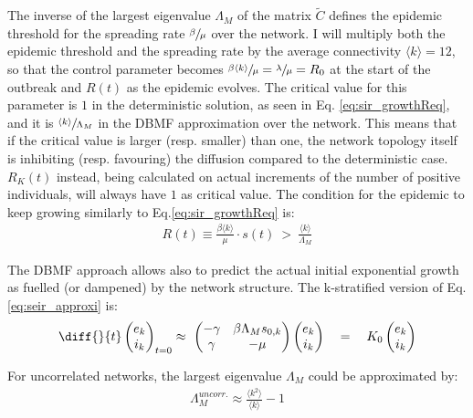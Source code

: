 \documentclass[DIV=12, BCOR=0pt]{scrartcl}  %
\begin{document}
  The inverse of the largest eigenvalue $\Lambda_M$ of the matrix $\tilde{C}$ defines the epidemic threshold for the spreading rate $\sfrac{\beta}{\mu}$ over the network. I will multiply both the epidemic threshold and the spreading rate by the average connectivity $\langle k \rangle = 12$, so that the control parameter becomes $\sfrac{\beta \langle k \rangle}{\mu} = \sfrac{\lambda}{\mu} = R_0$ at the start of the outbreak and $R(t)$ as the epidemic evolves. The critical value for this parameter is $1$ in the deterministic solution, as seen in Eq. \ref{eq:sir_growthReq}, and it is $\sfrac{\langle k \rangle}{\Lambda_M}$ in the DBMF approximation over the network. This means that if the critical value is larger (resp. smaller) than one, the network topology itself is inhibiting (resp. favouring) the diffusion compared to the deterministic case. $R_K(t)$ instead, being calculated on actual increments of the number of positive individuals, will always have $1$ as critical value. The condition for the epidemic to keep growing similarly to Eq.\ref{eq:sir_growthReq} is:
  \begin{align}
		 R(t) \equiv \frac{\beta \langle k \rangle }{\mu} \cdot s(t) \ > \ \frac{\langle k \rangle}{\Lambda_M}
  \end{align}
  
  The DBMF approach allows also to predict the actual initial exponential growth as fuelled (or dampened) by the network structure. The k-stratified version of Eq. \ref{eq:seir_approxi} is:
  \begin{align}
    	\diff{}{t}
	  \begin{pmatrix}
	  	e_k \\
	  	i_k
	  \end{pmatrix}_{t=0}
	  \approx \
	  \begin{pmatrix}
	  	- \gamma & \beta \Lambda_M s_{0,k} \\
	  	\gamma & - \mu
	  \end{pmatrix}
	  \begin{pmatrix}
	  	e_k \\
	  	i_k
	  \end{pmatrix}
	  \quad = \quad K_0 %
	  \begin{pmatrix}
	  	e_k \\
	  	i_k
	  \end{pmatrix} %
	  \label{eq:seir_approxiDBMF}
  \end{align}
  
  For uncorrelated networks, the largest eigenvalue $\Lambda_M$ could be approximated by:
  \begin{align}
  	\Lambda_M^{uncorr.} \approx \frac{\langle k^2 \rangle}{\langle k \rangle} - 1
  \end{align}
\end{document}
